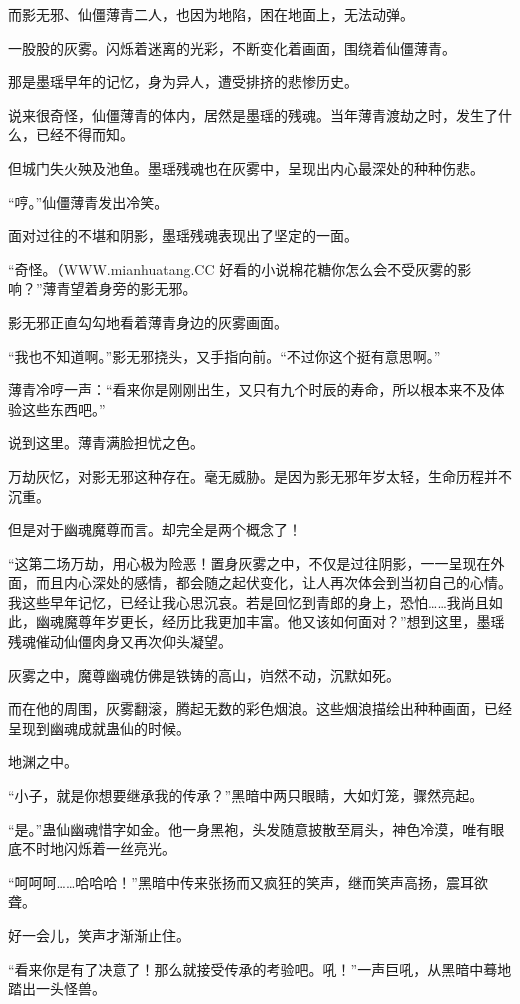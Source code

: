 \begin{this_body}
而影无邪、仙僵薄青二人，也因为地陷，困在地面上，无法动弹。

一股股的灰雾。闪烁着迷离的光彩，不断变化着画面，围绕着仙僵薄青。

那是墨瑶早年的记忆，身为异人，遭受排挤的悲惨历史。

说来很奇怪，仙僵薄青的体内，居然是墨瑶的残魂。当年薄青渡劫之时，发生了什么，已经不得而知。

但城门失火殃及池鱼。墨瑶残魂也在灰雾中，呈现出内心最深处的种种伤悲。

“哼。”仙僵薄青发出冷笑。

面对过往的不堪和阴影，墨瑶残魂表现出了坚定的一面。

“奇怪。（WWW.mianhuatang.CC 好看的小说棉花糖你怎么会不受灰雾的影响？”薄青望着身旁的影无邪。

影无邪正直勾勾地看着薄青身边的灰雾画面。

“我也不知道啊。”影无邪挠头，又手指向前。“不过你这个挺有意思啊。”

薄青冷哼一声：“看来你是刚刚出生，又只有九个时辰的寿命，所以根本来不及体验这些东西吧。”

说到这里。薄青满脸担忧之色。

万劫灰忆，对影无邪这种存在。毫无威胁。是因为影无邪年岁太轻，生命历程并不沉重。

但是对于幽魂魔尊而言。却完全是两个概念了！

“这第二场万劫，用心极为险恶！置身灰雾之中，不仅是过往阴影，一一呈现在外面，而且内心深处的感情，都会随之起伏变化，让人再次体会到当初自己的心情。我这些早年记忆，已经让我心思沉哀。若是回忆到青郎的身上，恐怕……我尚且如此，幽魂魔尊年岁更长，经历比我更加丰富。他又该如何面对？”想到这里，墨瑶残魂催动仙僵肉身又再次仰头凝望。

灰雾之中，魔尊幽魂仿佛是铁铸的高山，岿然不动，沉默如死。

而在他的周围，灰雾翻滚，腾起无数的彩色烟浪。这些烟浪描绘出种种画面，已经呈现到幽魂成就蛊仙的时候。

地渊之中。

“小子，就是你想要继承我的传承？”黑暗中两只眼睛，大如灯笼，骤然亮起。

“是。”蛊仙幽魂惜字如金。他一身黑袍，头发随意披散至肩头，神色冷漠，唯有眼底不时地闪烁着一丝亮光。

“呵呵呵……哈哈哈！”黑暗中传来张扬而又疯狂的笑声，继而笑声高扬，震耳欲聋。

好一会儿，笑声才渐渐止住。

“看来你是有了决意了！那么就接受传承的考验吧。吼！”一声巨吼，从黑暗中蓦地踏出一头怪兽。


\end{this_body}
